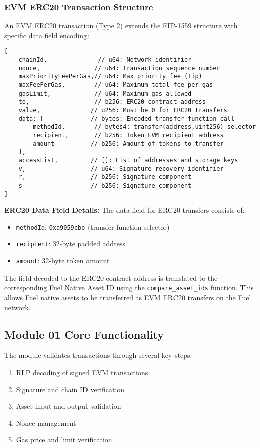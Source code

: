 \subsubsection{EVM ERC20 Transaction Structure}
An EVM ERC20 transaction (Type 2) extends the EIP-1559 structure with specific data field encoding:
\begin{lstlisting}
[
    chainId,              // u64: Network identifier
    nonce,               // u64: Transaction sequence number
    maxPriorityFeePerGas,// u64: Max priority fee (tip)
    maxFeePerGas,        // u64: Maximum total fee per gas
    gasLimit,            // u64: Maximum gas allowed
    to,                  // b256: ERC20 contract address
    value,              // u256: Must be 0 for ERC20 transfers
    data: [             // bytes: Encoded transfer function call
        methodId,        // bytes4: transfer(address,uint256) selector
        recipient,       // b256: Token EVM recipient address
        amount          // b256: Amount of tokens to transfer
    ],
    accessList,         // []: List of addresses and storage keys
    v,                  // u64: Signature recovery identifier
    r,                  // b256: Signature component
    s                   // b256: Signature component
]
\end{lstlisting}

\textbf{ERC20 Data Field Details:}
The data field for ERC20 transfers consists of:
\begin{itemize}
    \item \texttt{methodId}: \texttt{0xa9059cbb} (transfer function selector)
    \item \texttt{recipient}: 32-byte padded address
    \item \texttt{amount}: 32-byte token amount
\end{itemize}

The field decoded to the ERC20 contract address is translated to the corresponding Fuel Native Asset ID
using the \texttt{compare\_asset\_ids} function. This allows Fuel native assets to be transferred as EVM ERC20 transfers on the Fuel network.





\subsection{Module 01 Core Functionality}
The module validates transactions through several key steps:
\begin{enumerate}
    \item RLP decoding of signed EVM transactions
    \item Signature and chain ID verification
    \item Asset input and output validation
    \item Nonce management
    \item Gas price and limit verification
\end{enumerate}

